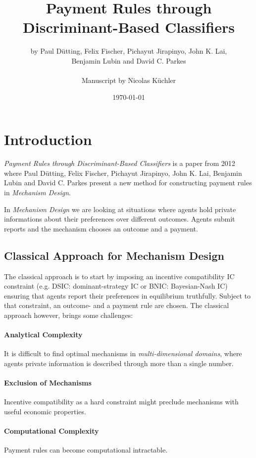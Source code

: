 \documentclass[]{article}
\title{Payment Rules through \\ Discriminant-Based Classifiers}
\author{ by Paul D\"utting, Felix Fischer, Pichayut Jirapinyo, John K. Lai, \\Benjamin Lubin and David C. Parkes \\ \\ Manuscript by Nicolas K\"uchler}
\date{\today}
\begin{document}
\maketitle

\section{Introduction}
\emph{Payment Rules through Discriminant-Based Classifiers} is a paper from 2012 where Paul D\"utting, Felix Fischer, Pichayut Jirapinyo, John K. Lai, Benjamin Lubin and David C. Parkes present a new method for constructing payment rules in \emph{Mechanism Design}.

\noindent In \emph{Mechanism Design} we are looking at situations where agents hold private informations about their preferences over different outcomes. 
Agents submit reports and the mechanism chooses an outcome and a payment.


\subsection{Classical Approach for Mechanism Design}
The classical approach is to start by imposing an incentive compatibility IC constraint (e.g. DSIC: dominant-strategy IC or BNIC: Bayesian-Nash IC) ensuring that agents report their preferences in equilibrium truthfully. Subject to that constraint, an outcome- and a payment rule are chosen. The classical approach however, brings some challenges:


\paragraph{Analytical Complexity} It is difficult to find optimal mechanisms in \emph{multi-dimensional domains}, where agents private information is described through more than a single number.

\paragraph{Exclusion of Mechanisms} Incentive compatibility as a hard constraint might preclude mechanisms with useful economic properties.

\paragraph{Computational Complexity} Payment rules can become computational intractable.
\end{document}
